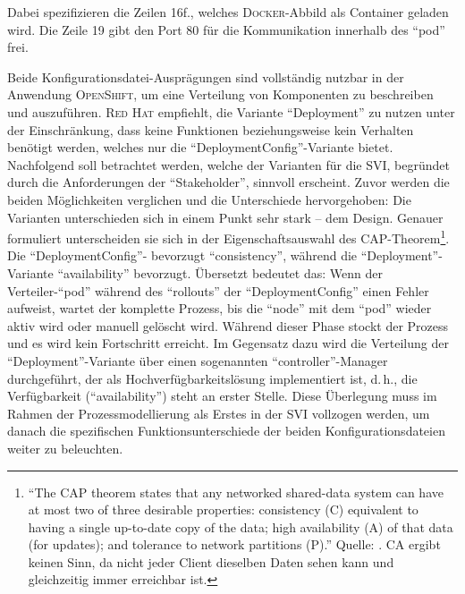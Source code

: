 Dabei spezifizieren die Zeilen 16f., welches \textsc{Docker}-Abbild als Container geladen wird. Die Zeile 19 gibt den Port 80 für die Kommunikation innerhalb des \enquote{pod} frei.
\par
Beide Konfigurationsdatei-Ausprägungen sind vollständig nutzbar in der Anwendung \textsc{OpenShift}, um eine Verteilung von Komponenten zu beschreiben und auszuführen. \textsc{Red Hat} empfiehlt, die Variante \enquote{Deployment} zu nutzen unter der Einschränkung, dass keine Funktionen beziehungsweise kein Verhalten benötigt werden, welches nur die \enquote{DeploymentConfig}-Variante bietet.\autocite[vgl.][Application\,$\rightarrow$\,Deployments]{red_hat_inc_okd_2019} Nachfolgend soll betrachtet werden, welche der Varianten für die \ac{SVI}, begründet durch die Anforderungen der \enquote{Stakeholder}, sinnvoll erscheint. Zuvor werden die beiden Möglichkeiten verglichen und die Unterschiede hervorgehoben: Die Varianten unterschieden sich in einem Punkt sehr stark -- dem Design. Genauer formuliert unterscheiden sie sich in der Eigenschaftsauswahl des CAP-Theorem\footnote{\enquote{The CAP theorem states that any networked shared-data system can have at most two of three desirable properties: consistency (C) equivalent to having a single up-to-date copy of the data; high availability (A) of that data (for updates); and tolerance to network partitions (P).} Quelle: \cite[][S.\,1]{brewer_cap_2012}. CA ergibt keinen Sinn, da nicht jeder Client dieselben Daten sehen kann und gleichzeitig immer erreichbar ist.}. Die \enquote{DeploymentConfig}- bevorzugt \enquote{consistency}, während die \enquote{Deployment}-Variante \enquote{availability} bevorzugt. Übersetzt bedeutet das: Wenn der Verteiler-\enquote{pod} während des \enquote{rollouts} der \enquote{DeploymentConfig} einen Fehler aufweist, wartet der komplette Prozess, bis die \enquote{node} mit dem \enquote{pod} wieder aktiv wird oder manuell gelöscht wird. Während dieser Phase stockt der Prozess und es wird kein Fortschritt erreicht. Im Gegensatz dazu wird die Verteilung der \enquote{Deployment}-Variante über einen sogenannten \enquote{controller}-Manager durchgeführt, der als Hochverfügbarkeitslösung implementiert ist, d.\,h., die Verfügbarkeit (\enquote{availability}) steht an erster Stelle. Diese Überlegung muss im Rahmen der Prozessmodellierung als Erstes in der \ac{SVI} vollzogen werden, um danach die spezifischen Funktionsunterschiede der beiden Konfigurationsdateien weiter zu beleuchten. 
\par
